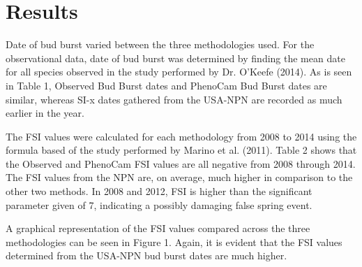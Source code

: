 \documentclass{article}\usepackage[]{graphicx}\usepackage[]{color}
\makeatletter
\newenvironment{kframe}{%
 \def\at@end@of@kframe{}%
 \ifinner\ifhmode%
  \def\at@end@of@kframe{\end{minipage}}%
  \begin{minipage}{\columnwidth}%
 \fi\fi%
 \def\FrameCommand##1{\hskip\@totalleftmargin \hskip-\fboxsep
 \colorbox{shadecolor}{##1}\hskip-\fboxsep
     \hskip-\linewidth \hskip-\@totalleftmargin \hskip\columnwidth}%
 \MakeFramed {\advance\hsize-\width
   \@totalleftmargin\z@ \linewidth\hsize
   \@setminipage}}%
 {\par\unskip\endMakeFramed%
 \at@end@of@kframe}
\makeatother
\begin{document}
\section{Results}
Date of bud burst varied between the three methodologies used. For the observational data, date of bud burst was determined by finding the mean date for all species observed in the study performed by Dr. O'Keefe (2014). %
As is seen in Table 1, Observed Bud Burst dates and PhenoCam Bud Burst dates are similar, whereas SI-x dates gathered from the USA-NPN are recorded as much earlier in the year.

\begin{kframe}


{\ttfamily\noindent\bfseries{}}

{\ttfamily\noindent\bfseries{}}\end{kframe}
The FSI values were calculated for each methodology from 2008 to 2014 using the formula based of the study performed by Marino et al. (2011). Table 2 shows that the Observed and PhenoCam FSI values are all negative from 2008 through 2014. The FSI values from the NPN are, on average, much higher in comparison to the other two methods. In 2008 and 2012, FSI is higher than the significant parameter given of 7, indicating a possibly damaging false spring event. 
\begin{kframe}


{\ttfamily\noindent\bfseries{}}\end{kframe}

A graphical representation of the FSI values compared across the three methodologies can be seen in Figure 1.  Again, it is evident that the FSI values determined from the USA-NPN bud burst dates are much higher.
\end{document}
